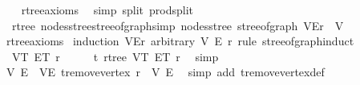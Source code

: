 \begin{isabellebody}
%
\isadelimproof
\ \ %
\endisadelimproof
%
\isatagproof
{}\isamarkupfalse%
\ rtree{\isacharunderscore}{\kern0pt}axioms\ \isamarkupfalse%
\ {\isacharparenleft}{\kern0pt}simp\ split{\isacharcolon}{\kern0pt}\ prod{\isachardot}{\kern0pt}split{\isacharparenright}{\kern0pt}%
\endisatagproof
{\isafoldproof}%
%
\isadelimproof
\isanewline
%
\endisadelimproof
\isanewline
{}\isamarkupfalse%
\ {\isacharparenleft}{\kern0pt}\ rtree{\isacharparenright}{\kern0pt}\ nodes{\isacharunderscore}{\kern0pt}stree{\isacharunderscore}{\kern0pt}stree{\isacharunderscore}{\kern0pt}of{\isacharunderscore}{\kern0pt}graph{\isacharbrackleft}{\kern0pt}simp{\isacharbrackright}{\kern0pt}{\isacharcolon}{\kern0pt}\ {\isachardoublequoteopen}nodes{\isacharunderscore}{\kern0pt}stree\ {\isacharparenleft}{\kern0pt}stree{\isacharunderscore}{\kern0pt}of{\isacharunderscore}{\kern0pt}graph\ {\isacharparenleft}{\kern0pt}V{\isacharcomma}{\kern0pt}E{\isacharcomma}{\kern0pt}r{\isacharparenright}{\kern0pt}{\isacharparenright}{\kern0pt}\ {\isacharequal}{\kern0pt}\ V{\isachardoublequoteclose}\isanewline
%
\isadelimproof
\ \ %
\endisadelimproof
%
\isatagproof
{}\isamarkupfalse%
\ rtree{\isacharunderscore}{\kern0pt}axioms\isanewline
{}\isamarkupfalse%
\ {\isacharparenleft}{\kern0pt}induction\ {\isachardoublequoteopen}{\isacharparenleft}{\kern0pt}V{\isacharcomma}{\kern0pt}E{\isacharcomma}{\kern0pt}r{\isacharparenright}{\kern0pt}{\isachardoublequoteclose}\ arbitrary{\isacharcolon}{\kern0pt}\ V\ E\ r\ rule{\isacharcolon}{\kern0pt}\ stree{\isacharunderscore}{\kern0pt}of{\isacharunderscore}{\kern0pt}graph{\isachardot}{\kern0pt}induct{\isacharparenright}{\kern0pt}\isanewline
\ \ \isamarkupfalse%
\ {\isacharparenleft}{\kern0pt}{}\ V\isactrlsub T\ E\isactrlsub T\ r{\isacharparenright}{\kern0pt}\isanewline
\ \ \isamarkupfalse%
\ \isamarkupfalse%
\ t{\isacharcolon}{\kern0pt}\ rtree\ V\isactrlsub T\ E\isactrlsub T\ r\ \isamarkupfalse%
\ simp\isanewline
\ \ \isamarkupfalse%
\ V{\isacharprime}{\kern0pt}\ E{\isacharprime}{\kern0pt}\ \ VE{\isacharprime}{\kern0pt}{\isacharcolon}{\kern0pt}\ {\isachardoublequoteopen}t{\isachardot}{\kern0pt}remove{\isacharunderscore}{\kern0pt}vertex\ r\ {\isacharequal}{\kern0pt}\ {\isacharparenleft}{\kern0pt}V{\isacharprime}{\kern0pt}{\isacharcomma}{\kern0pt}\ E{\isacharprime}{\kern0pt}{\isacharparenright}{\kern0pt}{\isachardoublequoteclose}\ \isamarkupfalse%
\ {\isacharparenleft}{\kern0pt}simp\ add{\isacharcolon}{\kern0pt}\ t{\isachardot}{\kern0pt}remove{\isacharunderscore}{\kern0pt}vertex{\isacharunderscore}{\kern0pt}def{\isacharparenright}{\kern0pt}\isanewline

\end{isabellebody}

